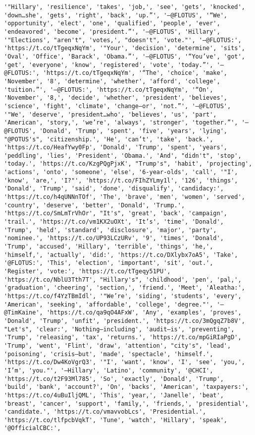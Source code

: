\documentclass[11pt]{article}
\begin{document}
\begin{Verbatim}[commandchars=\\\{\}]
'"Hillary', 'resilience', 'takes', 'job,', 'see', 'gets', 'knocked', 'down…she', 'gets', 'right', 'back', 'up.”', '—@FLOTUS', '“We', 'opportunity', 'elect', 'one', 'qualified', 'people', 'ever', 'endeavored', 'become', 'president.”', '—@FLOTUS', 'Hillary', '"Elections', "aren't", 'votes,', "doesn't", 'vote."', '—@FLOTUS:', 'https://t.co/tTgeqxNqYm', '"Your', 'decision', 'determine', 'sits', 'Oval', 'Office', 'Barack', 'Obama.”', '—@FLOTUS', '“You’ve', 'got', 'get', 'everyone', 'know', 'registered', 'vote', 'today.”', '—@FLOTUS:', 'https://t.co/tTgeqxNqYm', '“The', 'choice', 'make', 'November', '8', 'determine', 'whether', 'afford', 'college', 'tuition.”', '—@FLOTUS:', 'https://t.co/tTgeqxNqYm', '“On', 'November', '8,', 'decide', 'whether', 'president', 'believes', 'science', 'fight', 'climate', 'change—or', 'not.”', '—@FLOTUS', '"We', 'deserve', 'president…who', 'believes', 'us', 'part', 'American', 'story,', 'we’re', 'always', 'stronger', 'together.”', '—@FLOTUS', 'Donald', 'Trump', 'spent', 'five', 'years', 'lying', "@POTUS's", 'citizenship.', 'He', 'can’t', 'take', 'back.', 'https://t.co/HeafYwy0Fp', 'Donald', 'Trump', 'spent', 'years', 'peddling', 'lies', 'President', 'Obama.', 'And', "didn't", 'stop', 'today.', 'https://t.co/KzgPQgPjxK', "Trump's", 'habit', 'projecting', 'actions', 'onto', 'someone', 'else', '6-year-olds', 'call', '"I', 'know', 'are,', 'I?"', 'https://t.co/FIhZYLmy1l', '126', 'things', 'Donald', 'Trump', 'said', 'done', 'disqualify', 'candidacy:', 'https://t.co/h4qUNNnTOf', 'The', 'brave', 'men', 'women', 'served', 'country', 'deserve', 'better', 'Donald', 'Trump.', 'https://t.co/SmLmTrVhOr', "It's", 'great', 'back', 'campaign', 'trail.', 'https://t.co/vm1KX2uOXt', 'It’s', 'time', 'Donald', 'Trump', 'held', 'standard', 'disclosure', 'major', 'party', 'nominee.', 'https://t.co/UP93LCzURv', '9', 'times', 'Donald', 'Trump', 'accused', 'Hillary', 'terrible', 'things', 'he,', 'himself,', 'actually', 'did:', 'https://t.co/DXlybx7oA5', 'Take', '@FLOTUS:', 'This', 'election', 'important', 'sit', 'out.', 'Register', 'vote:', 'https://t.co/tTgeqy51PU', 'https://t.co/NblU3Tth7T', "Hillary's", 'childhood', 'pen', 'pal,', 'graduation', 'cheering', 'section,', 'friend.', 'Meet', 'Aleatha:', 'https://t.co/f4YzTBmIdl', '"We’re', 'siding', 'students', 'every', 'American', 'seeking', 'affordable', 'college', 'degree."', '—@TimKaine', 'https://t.co/qa9qO4AFxW', 'Any', 'examples', 'proves', 'Donald', 'Trump', 'unfit', 'president.', 'https://t.co/3mQgqZ7b8V', "Let's", 'clear:', 'Nothing—including', 'audit—is', 'preventing', 'Trump', 'releasing', 'tax', 'returns.', 'https://t.co/mpGiRIaPgD', 'Trump', 'went', 'Flint', 'draw', 'attention', "city's", 'lead', 'poisoning', 'crisis—but', 'made', 'spectacle', 'himself.', 'https://t.co/Dw4KoVgrQ3', '"I', 'want', 'know', 'I', 'see', 'you,', 'I’m', 'you."', '—Hillary', 'Latino', 'community', '@CHCI', 'https://t.co/t2F93Ml785', 'So', 'exactly', 'Donald', 'Trump', 'build', 'bank', 'account?', 'On', 'backs', 'American', 'taxpayers:', 'https://t.co/4uBuIljQML', 'This', 'year,', 'Janelle', 'beat', 'breast', 'cancer', 'support', 'family,', 'friends,', 'presidential', 'candidate.', 'https://t.co/vmavvobLcs', 'Presidential.', 'https://t.co/tlfpcbVqkT', 'Tune', 'watch', 'Hillary', 'speak', '@OfficialCBC:', 
\end{Verbatim}
\end{document}
